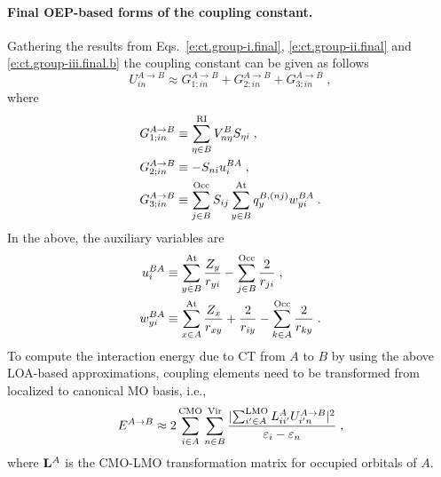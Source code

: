 \documentclass[aip,jcp,amsmath,amssymb,reprint,floatfix]{revtex4-1}
\begin{document}
\paragraph{Final OEP-based forms of the coupling constant.}
Gathering the results from Eqs.~\eqref{e:ct.group-i.final},
\eqref{e:ct.group-ii.final} and \eqref{e:ct.group-iii.final.b} the coupling constant
can be given as follows
%
\begin{equation} \label{e:ct-murell-etal.vin.oep}
U_{in}^{A\rightarrow B} 
       \approx 
 G_{1;in}^{A\rightarrow B} 
+G_{2;in}^{A\rightarrow B} 
+G_{3;in}^{A\rightarrow B} \;,
\end{equation}
%
where
%
\begin{subequations} \label{e:ct-murrell-etal.vin.oep-gterms}
\begin{align}
 G_{1;in}^{A\rightarrow B} &\equiv \sum_{\eta\in B}^{\rm RI} V^B_{n\eta} S_{\eta i} \;, \\
 G_{2;in}^{A\rightarrow B} &\equiv -S_{ni} u_i^{BA} \;, \\
 G_{3;in}^{A\rightarrow B} &\equiv
  \sum_{j   \in B}^{\rm Occ} S_{ij}
  \sum_{y   \in B}^{\rm At} q_y^{B,(nj)} w_{yi}^{BA}
\;.
\end{align}
\end{subequations}
%
In the above, the auxiliary variables are
%
\begin{subequations} \label{e:ct-murell-etal.vin.oep.aux-var}
\begin{align} \label{e:ct-murell-etal.vin.oep.aux-var.u} 
 u_i^{BA} &\equiv    
 \sum_{y\in B}^{\rm At}
  \frac{Z_y}{ r_{yi} } 
 -
 \sum_{j\in B}^{\rm Occ}
  \frac{2}{r_{ji}} 
                \;, \\ 
 w_{yi}^{BA} &\equiv 
   \sum_{x\in A}^{\rm At}
   \frac{Z_x}{r_{xy}}
  + \frac{2}{r_{iy}}
  - \sum_{k\in A}^{\rm Occ}
    \frac{2}{r_{ky}} 
                \;.
  \label{e:ct-murell-etal.vin.oep.aux-var.w}
\end{align}
\end{subequations}
%
To compute the interaction energy due to CT from $A$ to $B$ by using the above LOA\hyp{}based
approximations, coupling elements need to be transformed from localized to canonical MO basis, i.e.,
%
\begin{equation} \label{e:ect-oep.prefinal}
 E^{A\rightarrow B} \approx 
 2 
 \sum_{i\in A}^{\rm CMO}
 \sum_{n\in B}^{\rm Vir}
 \frac{
 \lvert
   \sum_{i'\in A}^{\rm LMO} L_{ii'}^A
   U_{i'n}^{A\rightarrow B}
 \rvert^2 }{\varepsilon_i - \varepsilon_n} \;,
\end{equation}
%
where ${\bf L}^A$ is the CMO\hyp{}LMO transformation matrix for occupied orbitals of $A$. 
\end{document}

